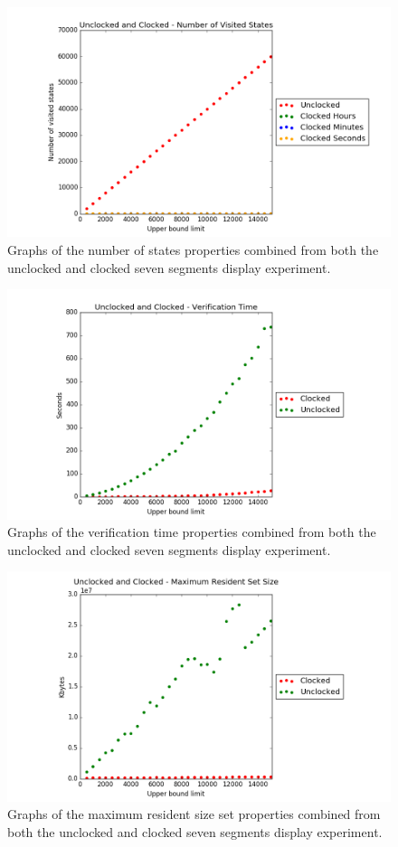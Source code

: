 \begin{figure}
    \centering
    \includegraphics[scale=0.6]{./figures/plots/combined_states.png}
\caption{Graphs of the number of states properties combined from both the unclocked and clocked seven segments display experiment.}
\label{fig:combined_states}
\end{figure}

\begin{figure}
    \centering
    \includegraphics[scale=0.6]{./figures/plots/combined_verification_time.png}
\caption{Graphs of the verification time properties combined from both the unclocked and clocked seven segments display experiment.}
\label{fig:combined_verification}
\end{figure}

\begin{figure}
    \centering
    \includegraphics[scale=0.6]{./figures/plots/combined_size.png}
\caption{Graphs of the maximum resident size set properties combined from both the unclocked and clocked seven segments display experiment.}
\label{fig:combined_resident_size}
\end{figure}